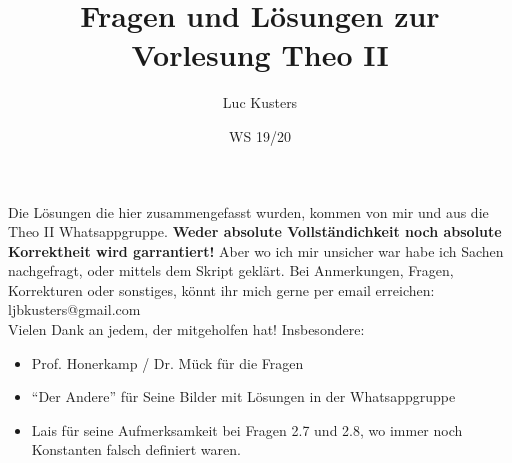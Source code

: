 \documentclass{scrartcl}
\title{Fragen und Lösungen zur Vorlesung Theo II}
\author{Luc Kusters}
\date{WS 19/20}
\begin{document}
\maketitle

\noindent
Die Lösungen die hier zusammengefasst wurden, kommen von mir und
aus die Theo II Whatsappgruppe. 
\textbf{Weder absolute Vollständichkeit noch absolute Korrektheit wird garrantiert!} Aber wo ich mir unsicher war habe ich Sachen nachgefragt, oder 
mittels dem Skript geklärt.
Bei Anmerkungen, Fragen, Korrekturen oder sonstiges, könnt ihr mich gerne 
per email erreichen:\\ 
ljbkusters@gmail.com \\

\noindent
Vielen Dank an jedem, der mitgeholfen hat! Insbesondere:
\begin{itemize}
  \item Prof. Honerkamp / Dr. Mück für die Fragen
  \item ``Der Andere'' für Seine Bilder mit Lösungen in der Whatsappgruppe
  \item Lais für seine Aufmerksamkeit bei Fragen 2.7 und 2.8, wo immer noch Konstanten falsch definiert waren.
\end{itemize}

\clearpage
\newpage
\setcounter{page}{1}
\tableofcontents
\newpage
\end{document}

